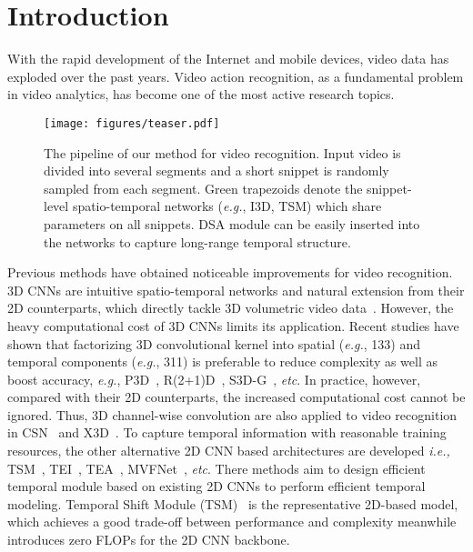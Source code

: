 \documentclass[sigconf]{acmart}
\def\x{}
\begin{document}





\maketitle






\section{Introduction}



  
With the rapid development of the Internet and mobile devices, video data has exploded over the past years. Video action recognition, as a fundamental problem in video analytics, has become one of the most active research topics. 
\begin{figure}[t]
    \centering
    \texttt{[image: figures/teaser.pdf]}
    \caption{
    The pipeline of our method for video recognition. Input video is divided into several segments and a short snippet is randomly sampled from each segment. Green trapezoids denote the snippet-level spatio-temporal networks (\emph{e.g.}, I3D, TSM) which share parameters on all snippets. DSA module can be easily inserted into the networks to capture long-range temporal structure.
    }
    \label{fig:overview}
\end{figure} 
Previous methods have obtained noticeable improvements for video recognition.
3D CNNs are intuitive spatio-temporal networks and natural extension from their 2D counterparts, which directly tackle 3D volumetric video data~\cite{c3d,i3d}. However, the heavy computational cost of 3D CNNs limits its application. Recent studies have shown that factorizing 3D convolutional kernel into spatial (\emph{e.g.}, 1\x3\x3) and temporal components (\emph{e.g.}, 3\x1\x1) is preferable to reduce complexity as well as boost accuracy, \emph{e.g.}, P3D~\cite{p3d}, R(2+1)D~\cite{r2+1d}, S3D-G~\cite{s3d}, \emph{etc}. 
In practice, however, compared with their 2D counterparts, the increased computational cost cannot be ignored.
Thus, 3D channel-wise convolution are also applied to video recognition in CSN~\cite{CSN} and X3D~\cite{feichtenhofer2020x3d}.
To capture temporal information with reasonable training resources, the other alternative 2D CNN based architectures are developed \emph{i.e.,} TSM~\cite{tsm}, TEI~\cite{teinet}, TEA~\cite{li2020tea}, MVFNet~\cite{wu2020MVFNet}, \emph{etc}. There methods aim to design efficient temporal module based on existing 2D CNNs to perform efficient temporal modeling.
Temporal Shift Module (TSM)~\cite{tsm} is the representative 2D-based model, which achieves a good trade-off between performance and complexity meanwhile introduces zero FLOPs for the 2D CNN backbone. 
\end{document}
